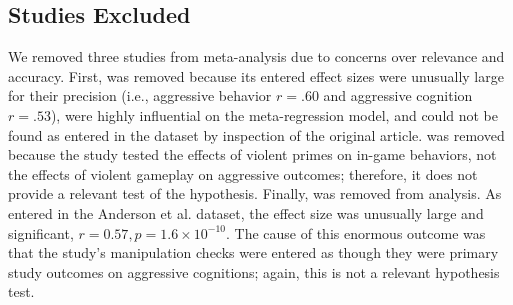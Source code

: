 \documentclass[man, mask]{apa6}
\begin{document}
\subsection{Studies Excluded}
We removed three studies from meta-analysis due to concerns over relevance and accuracy. First, \citet[study 1]{Matsuzaki:etal:2004} was removed because its entered effect sizes were unusually large for their precision (i.e., aggressive behavior $r = .60$ and aggressive cognition $r = .53$), were highly influential on the meta-regression model, and could not be found as entered in the \citet{Anderson:etal:2010} dataset by inspection of the original article. %
\citet{Panee:Ballard:2002} was removed because the study tested the effects of violent primes on in-game behaviors, not the effects of violent gameplay on aggressive outcomes; therefore, it does not provide a relevant test of the hypothesis. 
Finally, \citet{Graybill:etal:1985} was removed from analysis. As entered in the Anderson et al. dataset, the effect size was unusually large and significant, $r = 0.57, p = 1.6 \times 10^{-10}$. The cause of this enormous outcome was that the study's manipulation checks were entered as though they were primary study outcomes on aggressive cognitions; again, this is not a relevant hypothesis test. %

\end{document}
